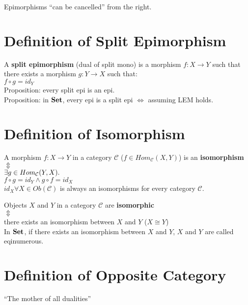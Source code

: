 \documentclass[a4paper, twoside, english, 11pt]{book}
\newcommand{\C}{\mathcal C}
\newcommand{\catname}[1]{{\normalfont\textbf{#1}}}
\newcommand{\Set}{\catname{Set}}
\begin{document}
\noindent
Epimorphisms ``can be cancelled'' from the right.



\section{Definition of Split Epimorphism}

A \textbf{split epimorphism} (dual of split mono) is a morphism $f : X \rightarrow Y$ such that there exists a morphism $g : Y \rightarrow X$ such that: \\

$f \circ g = id_Y$ \\

\noindent
Proposition: every split epi is an epi. \\
Proposition: in $\Set$, every epi is a split epi $\iff$ assuming LEM holds.



\section{Definition of Isomorphism}

A morphism $f : X \rightarrow Y$ in a category $\C$ ($f \in Hom_\C(X, Y)$) is an \textbf{isomorphism} \\
\indent
$\Updownarrow$ \\ %
$\exists g \in Hom_\C(Y, X) \ldotp$ \\
$f \circ g = id_Y \land g \circ f = id_X$ \\

\noindent
$id_X \forall X \in Ob(\C)$ is always an isomorphisms for every category $\C$.

\noindent
Objects $X$ and $Y$ in a category $\C$ are \textbf{isomorphic} \\
\indent
$\Updownarrow$ \\ %
there exists an isomorphism between $X$ and $Y$ ($X \cong Y$) \\

\noindent
In $\Set$, if there exists an isomorphism between $X$ and $Y$, $X$ and $Y$ are called eqinumerous.



\section{Definition of Opposite Category}

``The mother of all dualities'' \\
\end{document}
